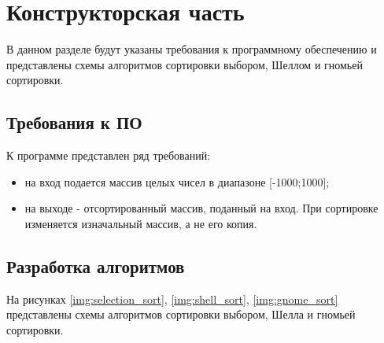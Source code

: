 \chapter{Конструкторская часть}

В данном разделе будут указаны требования к программному обеспечению и представлены схемы алгоритмов сортировки выбором, Шеллом и гномьей сортировки.

\section{Требования к ПО}

К программе представлен ряд требований:

\begin{itemize}
	\item на вход подается массив целых чисел в диапазоне [-1000;1000];
	\item на выходе - отсортированный массив, поданный на вход. При сортировке изменяется изначальный массив, а не его копия.
\end{itemize}

\section{Разработка алгоритмов}

На рисунках \ref{img:selection_sort}, \ref{img:shell_sort}, \ref{img:gnome_sort} представлены схемы алгоритмов сортировки выбором, Шелла и гномьей сортировки.

